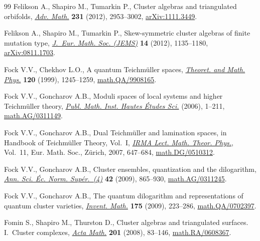 \documentclass[pdftex]{sigma}
\numberwithin{equation}{section}
\begin{document}
\begin{thebibliography}{99}
Felikson A., Shapiro M., Tumarkin P., Cluster algebras and triangulated
 orbifolds, \href{https://doi.org/10.1016/j.aim.2012.07.032}{\textit{Adv. Math.}} \textbf{231} (2012), 2953--3002,
 \href{https://arxiv.org/abs/1111.3449}{arXiv:1111.3449}.

Felikson A., Shapiro M., Tumarkin P., Skew-symmetric cluster algebras of finite
 mutation type, \href{https://doi.org/10.4171/JEMS/329}{\textit{J.~Eur. Math. Soc. (JEMS)}} \textbf{14} (2012),
 1135--1180, \href{https://arxiv.org/abs/0811.1703}{arXiv:0811.1703}.

Fock V.V., Chekhov L.O., A quantum {T}eichm\"{u}ller spaces, \href{https://doi.org/10.1007/BF02557246}{\textit{Theoret.
 and Math. Phys.}} \textbf{120} (1999), 1245--1259, \href{https://arxiv.org/abs/math.QA/9908165}{math.QA/9908165}.

Fock V.V., Goncharov A.B., Moduli spaces of local systems and higher
 {T}eichm\"{u}ller theory, \href{https://doi.org/10.1007/s10240-006-0039-4}{\textit{Publ. Math. Inst. Hautes \'{E}tudes Sci.}}
 (2006), 1--211, \href{https://arxiv.org/abs/math.AG/0311149}{math.AG/0311149}.

Fock V.V., Goncharov A.B., Dual {T}eichm\"{u}ller and lamination spaces, in
 Handbook of {T}eichm\"{u}ller Theory, {V}ol.~{I}, \href{https://doi.org/10.4171/029-1/16}{\textit{IRMA Lect. Math.
 Theor. Phys.}}, Vol.~11, Eur. Math. Soc., Z\"{u}rich, 2007, 647--684,
 \href{https://arxiv.org/abs/math.DG/0510312}{math.DG/0510312}.

Fock V.V., Goncharov A.B., Cluster ensembles, quantization and the dilogarithm,
 \href{https://doi.org/10.1007/978-0-8176-4745-2_15}{\textit{Ann. Sci. \'{E}c. Norm. Sup\'{e}r.~(4)}} \textbf{42} (2009), 865--930,
 \href{https://arxiv.org/abs/math.AG/0311245}{math.AG/0311245}.

Fock V.V., Goncharov A.B., The quantum dilogarithm and representations of
 quantum cluster varieties, \href{https://doi.org/10.1007/s00222-008-0149-3}{\textit{Invent. Math.}} \textbf{175} (2009),
 223--286, \href{https://arxiv.org/abs/math.QA/0702397}{math.QA/0702397}.

Fomin S., Shapiro M., Thurston D., Cluster algebras and triangulated surfaces.
 {I}.~{C}luster complexes, \href{https://doi.org/10.1007/s11511-008-0030-7}{\textit{Acta Math.}} \textbf{201} (2008), 83--146,
 \href{https://arxiv.org/abs/math.RA/0608367}{math.RA/0608367}.


\end{thebibliography}
\end{document}

